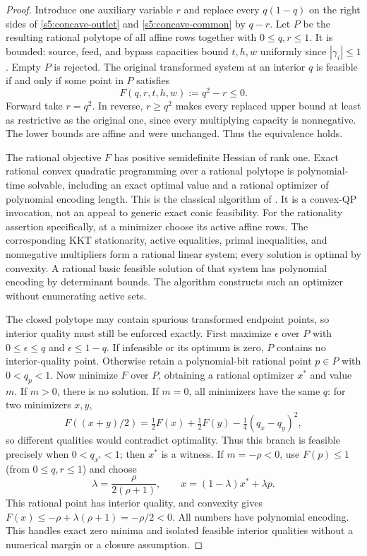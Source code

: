 \begin{proof}
Introduce one auxiliary variable $r$ and replace every $q(1-q)$ on
the right sides of \eqref{s5:concave-outlet} and
\eqref{s5:concave-common} by $q-r$. Let $P$ be the resulting rational
polytope of all affine rows together with $0\le q,r\le1$. It is
bounded: source, feed, and bypass capacities bound $t,h,w$ uniformly
since $|\gamma_i|\le1$. Empty $P$ is rejected. The original transformed
system at an interior $q$ is feasible if and only if some point in $P$
satisfies
\begin{equation}
 F(q,r,t,h,w):=q^2-r\le0.
 \label{s5:single-qp}
\end{equation}
Forward take $r=q^2$. In reverse, $r\ge q^2$ makes every replaced
upper bound at least as restrictive as the original one, since every
multiplying capacity is nonnegative. The lower bounds are affine and
were unchanged. Thus the equivalence holds.

The rational objective $F$ has positive semidefinite Hessian of rank
one. Exact rational convex quadratic programming over a rational
polytope is polynomial-time solvable, including an exact optimal value
and a rational optimizer of polynomial encoding length. This is the
classical algorithm of \citet[pp.~1320--1323; numbered paragraphs~3
and~6 for rational optimal solutions and recovery]{s5:kozlov1980}.
It is a convex-QP invocation, not an appeal to generic exact conic
feasibility. For the rationality assertion specifically, at a minimizer
choose its active affine rows. The corresponding KKT stationarity,
active equalities, primal inequalities, and nonnegative multipliers
form a rational linear system; every solution is optimal by convexity.
A rational basic feasible solution of that system has polynomial
encoding by determinant bounds. The algorithm constructs such an
optimizer without enumerating active sets.

The closed polytope may contain spurious transformed endpoint points,
so interior quality must still be enforced exactly. First maximize
$\epsilon$ over $P$ with
$0\le\epsilon\le q$ and $\epsilon\le1-q$. If infeasible or its optimum
is zero, $P$ contains no interior-quality point. Otherwise retain a
polynomial-bit rational point $p\in P$ with $0<q_p<1$. Now minimize
$F$ over $P$, obtaining a rational optimizer $x^*$ and value $m$.
If $m>0$, there is no solution. If $m=0$, all minimizers have the same
$q$: for two minimizers $x,y$,
\[
 F((x+y)/2)=\tfrac12F(x)+\tfrac12F(y)-\tfrac14(q_x-q_y)^2,
\]
so different qualities would contradict optimality. Thus this branch
is feasible precisely when $0<q_{x^*}<1$; then $x^*$ is a witness.
If $m=-\rho<0$, use $F(p)\le1$ (from $0\le q,r\le1$) and choose
\[
 \lambda=\frac{\rho}{2(\rho+1)},\qquad
 x=(1-\lambda)x^*+\lambda p.
\]
This rational point has interior quality, and convexity gives
$F(x)\le-\rho+\lambda(\rho+1)=-\rho/2<0$. All numbers have polynomial
encoding. This handles exact zero minima and isolated feasible interior
qualities without a numerical margin or a closure assumption.


\end{proof}
